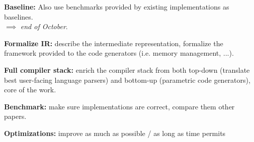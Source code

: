 \documentclass[11pt]{article}
\begin{document}
\item \textbf{Baseline:} Also use benchmarks provided by existing implementations as baselines.\\
$\implies$ \emph{end of October}.

\item \textbf{Formalize IR:} describe the intermediate representation, formalize the framework provided to the code generators (i.e. memory management, ...).
\item \textbf{Full compiler stack:} enrich the compiler stack from both top-down (translate best user-facing language parsers) and bottom-up (parametric code generators), core of the work.
\item \textbf{Benchmark:} make sure implementations are correct, compare them other papers.
\item \textbf{Optimizations:} improve as much as possible / as long as time permits
\ole
\end{document}
